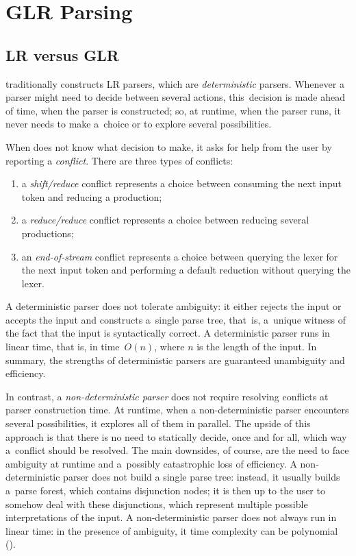 \section{GLR Parsing}
\label{sec:GLR}


\subsection{LR versus GLR}
\label{sec:GLR:intro}

\menhir traditionally constructs LR parsers,
which are \emph{deterministic} parsers.
Whenever a parser might need to decide between several actions,
this~decision is made ahead of time, when the parser is constructed;
so, at runtime, when the parser runs, it never needs to make a~choice
or to explore several possibilities.

When \menhir does not know what decision to make,
it asks for help from the user by reporting a \emph{conflict}.
There are three types of conflicts:
\begin{enumerate}
\item a \emph{shift/reduce} conflict
      represents a choice between
      consuming the next input token
      and reducing a production;
\item a \emph{reduce/reduce} conflict
      represents a choice between
      reducing several productions;
\item an \emph{end-of-stream} conflict
      represents a choice between
      querying the lexer for the next input token
      and performing a default reduction
      without querying the lexer.
\end{enumerate}

A deterministic parser does not tolerate ambiguity:
it either rejects the input
or accepts the input and constructs a~single parse tree, %
that~is, a~unique witness of the fact that the input
is syntactically correct.
%
A deterministic parser runs in linear time,
that is, in time~$O(n)$,
where $n$ is the length of the input.
%
In summary,
the strengths of deterministic parsers are
guaranteed unambiguity and efficiency.

In contrast,
a \emph{non-deterministic parser}
does not require resolving conflicts
at parser construction time.
%
At runtime, when a non-deterministic parser
encounters several possibilities,
it explores all of them in parallel.
%
The upside of this approach is that there is no need
to statically decide, once and for all, which way a~conflict
should be resolved.
%
The main downsides, of course, are
the need to face ambiguity at runtime
and a~possibly catastrophic loss of efficiency.
%
A non-deterministic parser does not build a single parse tree: instead, it
usually builds a~parse forest, which contains disjunction nodes; it is then up
to the user to somehow deal with these disjunctions, which represent multiple
possible interpretations of the input.
%
A non-deterministic parser does not always run in linear time:
in the presence of ambiguity,
it time complexity can be polynomial ().

